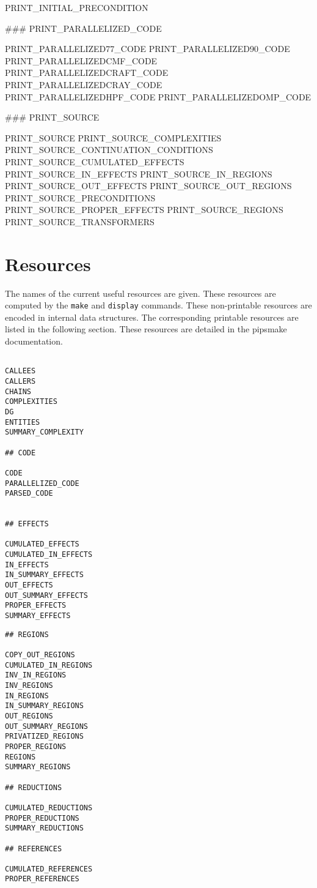 \documentclass[a4paper,12pt]{article}
\begin{document}
\begin{verbatim*}
PRINT_INITIAL_PRECONDITION

### PRINT_PARALLELIZED_CODE

PRINT_PARALLELIZED77_CODE
PRINT_PARALLELIZED90_CODE
PRINT_PARALLELIZEDCMF_CODE
PRINT_PARALLELIZEDCRAFT_CODE
PRINT_PARALLELIZEDCRAY_CODE
PRINT_PARALLELIZEDHPF_CODE
PRINT_PARALLELIZEDOMP_CODE

### PRINT_SOURCE

PRINT_SOURCE
PRINT_SOURCE_COMPLEXITIES
PRINT_SOURCE_CONTINUATION_CONDITIONS
PRINT_SOURCE_CUMULATED_EFFECTS
PRINT_SOURCE_IN_EFFECTS
PRINT_SOURCE_IN_REGIONS
PRINT_SOURCE_OUT_EFFECTS
PRINT_SOURCE_OUT_REGIONS
PRINT_SOURCE_PRECONDITIONS
PRINT_SOURCE_PROPER_EFFECTS
PRINT_SOURCE_REGIONS
PRINT_SOURCE_TRANSFORMERS
\end{verbatim*}

\section{Resources}
\label{res}
The names of the current useful resources are given. These resources are
computed by the \verb+make+ and \verb+display+ commands. These
non-printable resources are encoded in internal data structures. The
corresponding printable resources are listed in the following section.
These resources are detailed in the pipsmake documentation.

\begin{verbatim}

CALLEES
CALLERS
CHAINS  
COMPLEXITIES  
DG      
ENTITIES 
SUMMARY_COMPLEXITY

## CODE 

CODE  
PARALLELIZED_CODE
PARSED_CODE


## EFFECTS

CUMULATED_EFFECTS
CUMULATED_IN_EFFECTS
IN_EFFECTS
IN_SUMMARY_EFFECTS
OUT_EFFECTS
OUT_SUMMARY_EFFECTS
PROPER_EFFECTS
SUMMARY_EFFECTS
\end{verbatim}

\begin{verbatim}
## REGIONS
 
COPY_OUT_REGIONS                        
CUMULATED_IN_REGIONS                    
INV_IN_REGIONS                          
INV_REGIONS                             
IN_REGIONS
IN_SUMMARY_REGIONS
OUT_REGIONS
OUT_SUMMARY_REGIONS
PRIVATIZED_REGIONS
PROPER_REGIONS
REGIONS 
SUMMARY_REGIONS

## REDUCTIONS 

CUMULATED_REDUCTIONS                    
PROPER_REDUCTIONS
SUMMARY_REDUCTIONS

## REFERENCES

CUMULATED_REFERENCES                    
PROPER_REFERENCES
\end{verbatim}
\end{document}
